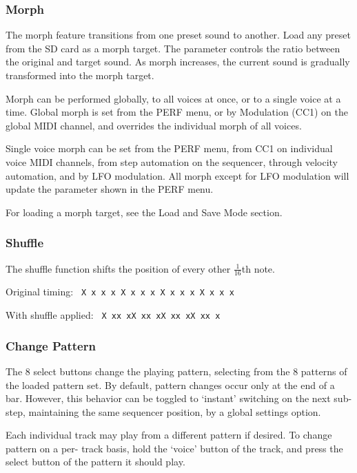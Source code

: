\subsubsection{Morph}\label{morph}

The morph feature transitions from one preset sound to another. Load any
preset from the SD card as a morph target. The  parameter
controls the ratio between the original and target sound. As morph
increases, the current sound is gradually transformed into the morph
target.

Morph can be performed globally, to all voices at once, or to a single
voice at a time. Global morph is set from the PERF menu, or by
Modulation (CC1) on the global MIDI channel, and overrides the
individual morph of all voices.

Single voice morph can be set from the PERF menu, from CC1 on individual
voice MIDI channels, from step automation on the sequencer, through
velocity automation, and by LFO modulation. All morph except for LFO
modulation will update the parameter shown in the PERF menu.

For loading a morph target, see the Load and Save Mode section.

\subsubsection{Shuffle}\label{shuffle}

The shuffle function shifts the position of every other
\(\frac{1}{16}\)th note.

Original timing:
\texttt{\textbar{}\ X\ x\ x\ x\ X\ x\ x\ x\ X\ x\ x\ x\ X\ x\ x\ x\ \textbar{}}

With shuffle applied:
\texttt{\textbar{}\ X\ xx\ xX\ xx\ xX\ xx\ xX\ xx\ x\ \textbar{}}

\subsubsection{Change Pattern}\label{change-pattern}

The 8 select buttons change the playing pattern, selecting from the 8
patterns of the loaded pattern set. By default, pattern changes occur
only at the end of a bar. However, this behavior can be toggled to
`instant' switching on the next sub-step, maintaining the same sequencer
position, by a global settings option.

Each individual track may play from a different pattern if desired. To
change pattern on a per- track basis, hold the `voice' button of the
track, and press the select button of the pattern it should play.

